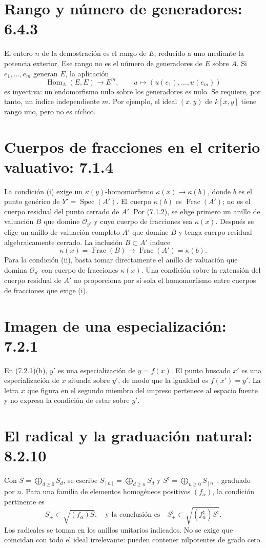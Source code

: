 \documentclass[11pt,a4paper]{article}
\DeclareMathOperator{\Spec}{Spec}
\begin{document}
\section{Rango y número de generadores: 6.4.3}
El entero $n$ de la demostración es el rango de $E$, reducido a uno
mediante la potencia exterior. Ese rango no es el número de
generadores de $E$ sobre $A$. Si $e_1,\ldots,e_m$ generan $E$,
la aplicación
\[
\operatorname{Hom}_A(E,E)\longrightarrow E^m,
\qquad u\longmapsto(u(e_1),\ldots,u(e_m))
\]
es inyectiva: un endomorfismo nulo sobre los generadores es nulo.
Se requiere, por tanto, un índice independiente $m$. Por ejemplo,
el ideal $(x,y)$ de $k[x,y]$ tiene rango uno, pero no es cíclico.

\section{Cuerpos de fracciones en el criterio valuativo: 7.1.4}
La condición (i) exige un $\kappa(y)$-homomorfismo
$\kappa(x)\to\kappa(b)$, donde $b$ es el punto genérico de
$Y'=\Spec(A')$. El cuerpo $\kappa(b)$ es $\operatorname{Frac}(A')$;
no es el cuerpo residual del punto cerrado de $A'$.
Por (7.1.2), se elige primero un anillo de valuación $B$ que domine
$\mathcal O_{y'}$ y cuyo cuerpo de fracciones sea $\kappa(x)$.
Después se elige un anillo de valuación completo $A'$ que domine
$B$ y tenga cuerpo residual algebraicamente cerrado. La inclusión
$B\subset A'$ induce
\[
\kappa(x)=\operatorname{Frac}(B)
\longrightarrow\operatorname{Frac}(A')=\kappa(b).
\]
Para la condición (ii), basta tomar directamente el anillo de
valuación que domina $\mathcal O_{y'}$ con cuerpo de fracciones
$\kappa(x)$. Una condición sobre la extensión del cuerpo residual
de $A'$ no proporciona por sí sola el homomorfismo entre cuerpos
de fracciones que exige (i).

\section{Imagen de una especialización: 7.2.1}
En (7.2.1)(b), $y'$ es una especialización de $y=f(x)$.
El punto buscado $x'$ es una especialización de $x$ situada sobre
$y'$, de modo que la igualdad es $f(x')=y'$.
La letra $x$ que figura en el segundo miembro del impreso pertenece
al espacio fuente y no expresa la condición de estar sobre $y'$.

\section{El radical y la graduación natural: 8.2.10}
Con $S=\bigoplus_{d\geq0}S_d$, se escribe
$S_{[n]}=\bigoplus_{d\geq n}S_d$ y
$S^\natural=\bigoplus_{n\geq0}S_{[n]}$, graduado por $n$.
Para una familia de elementos homogéneos positivos $(f_\alpha)$,
la condición pertinente es
\[
S_+\subset\sqrt{(f_\alpha)S},
\quad\text{y la conclusión es}\quad
S^\natural_+\subset\sqrt{(f^\natural_\alpha)S^\natural}.
\]
Los radicales se toman en los anillos unitarios indicados. No se
exige que coincidan con todo el ideal irrelevante: pueden contener
nilpotentes de grado cero.
\end{document}
